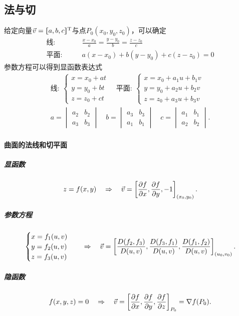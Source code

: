 \subsection{法与切}
给定向量$\vec v=\lfloor\hspace{-4.7 pt}\lceil a,b,c\rceil\hspace{-4.7 pt}\rfloor^{\mathrm T}$与点$P_0(x_0,y_0,z_0)$，可以确定
\begin{align*}
	\text{线}:   & \qquad \frac{x-x_0}a=\frac{y-y_0}b=\frac{z-z_0}c \\
	\text{平面}: & \qquad a(x-x_0)+b(y-y_0)+c(z-z_0)=0
\end{align*}
参数方程可以得到显函数表达式
\begin{gather*}
	\text{线}:~
	\begin{cases}
		x=x_0+at \\[-1ex]
		y=y_0+bt \\[-1ex]
		z=z_0+ct
	\end{cases}
	\quad
	\text{平面}:~
	\begin{cases}
		x=x_0+a_1u+b_1v \\[-1ex]
		y=y_0+a_2u+b_2v \\[-1ex]
		z=z_0+a_3u+b_3v
	\end{cases}
	\\
	a=
	\begin{vmatrix}
		a_2 & b_2 \\
		a_3 & b_3
	\end{vmatrix}\quad b=
	\begin{vmatrix}
		a_3 & b_3 \\
		a_1 & b_1
	\end{vmatrix}\quad c=
	\begin{vmatrix}
		a_1 & b_1 \\
		a_2 & b_2
	\end{vmatrix}.
\end{gather*}
\paragraph{曲面的法线和切平面}
\subparagraph{显函数}
\[z=f(x,y)\thus\vec v=\left[\pv fx,\pv fy,-1\right]_{(x_0,y_0)}.\]
\subparagraph{参数方程}
\begin{align*}
	\begin{cases}
		x=f_1(u,v) \\
		y=f_2(u,v) \\
		z=f_3(u,v)
	\end{cases}
	\quad\Rightarrow\quad\vec v=\left[\frac{D(f_2,f_3)}{D(u,v)},\frac{D(f_3,f_1)}{D(u,v)},\frac{D(f_1,f_2)}{D(u,v)}\right]_{(u_0,v_0)}.
\end{align*}
\subparagraph{隐函数}
\[f(x,y,z)=0\thus\vec v=\fkh{\pv fx,\pv fy,\pv fz}_{P_0}=\nabla f(P_0).\]
